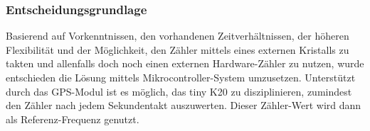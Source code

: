    \subsubsection{Entscheidungsgrundlage}
		Basierend auf Vorkenntnissen, den vorhandenen Zeitverhältnissen, der höheren Flexibilität und der Möglichkeit, den Zähler mittels eines externen Kristalls zu takten und allenfalls doch noch einen externen Hardware-Zähler zu nutzen, wurde entschieden die Lösung mittels Mikrocontroller-System umzusetzen. 
		Unterstützt durch das GPS-Modul ist es möglich, das tiny K20 zu disziplinieren, zumindest den Zähler nach jedem Sekundentakt auszuwerten. Dieser Zähler-Wert wird dann als Referenz-Frequenz genutzt.
%
%
\clearpage
